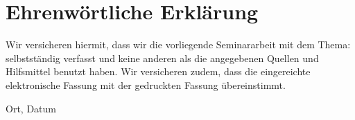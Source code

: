 
\clearpage
\chapter*{Ehrenwörtliche Erklärung}


Wir versicheren hiermit, dass wir die vorliegende Seminararbeit
 mit dem Thema: \textit{\DerTitelDerArbeit} selbstständig verfasst und keine anderen als die angegebenen Quellen und
Hilfsmittel benutzt haben. Wir versicheren zudem,
dass die eingereichte elektronische Fassung mit der gedruckten Fassung übereinstimmt.

\vspace{8cm}
Ort, Datum 